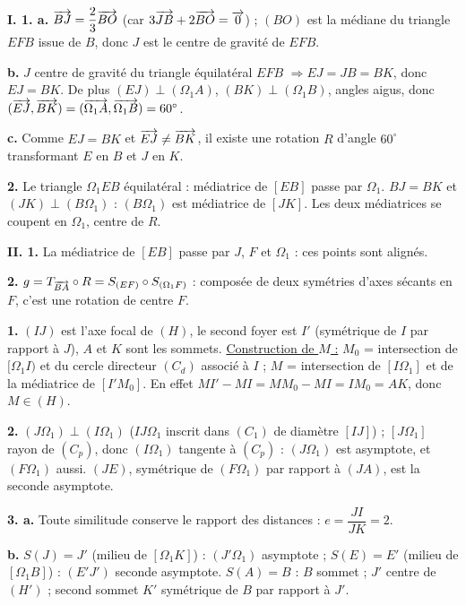\documentclass[11pt]{article}
\begin{document}
\textbf{I. 1. a.} $\overrightarrow{BJ} = \dfrac{2}{3}\overrightarrow{BO}$ (car $3\overrightarrow{JB} + 2\overrightarrow{BO} = \overrightarrow{0}$) ; $(BO)$ est la médiane du triangle $EFB$ issue de $B$, donc $J$ est le centre de gravité de $EFB$.

\textbf{b.} $J$ centre de gravité du triangle équilatéral $EFB$ $\Rightarrow EJ = JB = BK$, donc $EJ = BK$. De plus $(EJ) \perp (\Omega_1 A)$, $(BK) \perp (\Omega_1 B)$, angles aigus, donc $(\overrightarrow{EJ}, \overrightarrow{BK}) = (\overrightarrow{\Omega_1 A}, \overrightarrow{\Omega_1 B}) = 60^\circ$.

\textbf{c.} Comme $EJ = BK$ et $\overrightarrow{EJ} \ne \overrightarrow{BK}$, il existe une rotation $R$ d'angle $60^\circ$ transformant $E$ en $B$ et $J$ en $K$.

\textbf{2.} Le triangle $\Omega_1 EB$ équilatéral : médiatrice de $[EB]$ passe par $\Omega_1$. $BJ = BK$ et $(JK) \perp (B\Omega_1)$ : $(B\Omega_1)$ est médiatrice de $[JK]$. Les deux médiatrices se coupent en $\Omega_1$, centre de $R$.

\textbf{II. 1.} La médiatrice de $[EB]$ passe par $J$, $F$ et $\Omega_1$ : ces points sont alignés.

\textbf{2.} $g = T_{\overrightarrow{BA}} \circ R = S_{(EF)} \circ S_{(\Omega_1 F)}$ : composée de deux symétries d'axes sécants en $F$, c'est une rotation de centre $F$.

\textbf{1.} $(IJ)$ est l'axe focal de $(H)$, le second foyer est $I'$ (symétrique de $I$ par rapport à $J$), $A$ et $K$ sont les sommets. \underline{Construction de $M$ :} $M_0$ = intersection de $[\Omega_1 I)$ et du cercle directeur $(C_d)$ associé à $I$ ; $M$ = intersection de $[I\Omega_1]$ et de la médiatrice de $[I'M_0]$. En effet $MI' - MI = MM_0 - MI = IM_0 = AK$, donc $M \in (H)$.

\textbf{2.} $(J\Omega_1) \perp (I\Omega_1)$ ($IJ\Omega_1$ inscrit dans $(C_1)$ de diamètre $[IJ]$) ; $[J\Omega_1]$ rayon de $(C_p)$, donc $(I\Omega_1)$ tangente à $(C_p)$ : $(J\Omega_1)$ est asymptote, et $(F\Omega_1)$ aussi. $(JE)$, symétrique de $(F\Omega_1)$ par rapport à $(JA)$, est la seconde asymptote.

\textbf{3. a.} Toute similitude conserve le rapport des distances : $e = \dfrac{JI}{JK} = 2$.

\textbf{b.} $S(J) = J'$ (milieu de $[\Omega_1 K]$) : $(J'\Omega_1)$ asymptote ; $S(E) = E'$ (milieu de $[\Omega_1 B]$) : $(E'J')$ seconde asymptote. $S(A) = B$ : $B$ sommet ; $J'$ centre de $(H')$ ; second sommet $K'$ symétrique de $B$ par rapport à $J'$.
\end{document}

